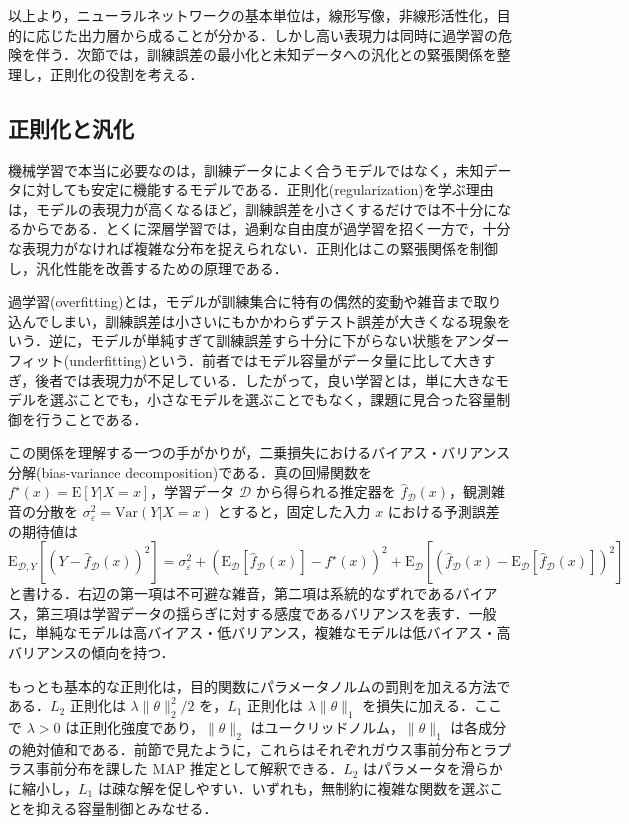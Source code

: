 以上より，ニューラルネットワークの基本単位は，線形写像，非線形活性化，目的に応じた出力層から成ることが分かる．しかし高い表現力は同時に過学習の危険を伴う．次節では，訓練誤差の最小化と未知データへの汎化との緊張関係を整理し，正則化の役割を考える．

\subsection{正則化と汎化}
機械学習で本当に必要なのは，訓練データによく合うモデルではなく，未知データに対しても安定に機能するモデルである．正則化(regularization)を学ぶ理由は，モデルの表現力が高くなるほど，訓練誤差を小さくするだけでは不十分になるからである．とくに深層学習では，過剰な自由度が過学習を招く一方で，十分な表現力がなければ複雑な分布を捉えられない．正則化はこの緊張関係を制御し，汎化性能を改善するための原理である．

過学習(overfitting)とは，モデルが訓練集合に特有の偶然的変動や雑音まで取り込んでしまい，訓練誤差は小さいにもかかわらずテスト誤差が大きくなる現象をいう．逆に，モデルが単純すぎて訓練誤差すら十分に下がらない状態をアンダーフィット(underfitting)という．前者ではモデル容量がデータ量に比して大きすぎ，後者では表現力が不足している．したがって，良い学習とは，単に大きなモデルを選ぶことでも，小さなモデルを選ぶことでもなく，課題に見合った容量制御を行うことである．

この関係を理解する一つの手がかりが，二乗損失におけるバイアス・バリアンス分解(bias-variance decomposition)である．真の回帰関数を $f^\star(x)=\mathrm{E}[Y|X=x]$，学習データ $\mathcal D$ から得られる推定器を $\hat f_{\mathcal D}(x)$，観測雑音の分散を $\sigma_\varepsilon^2=\mathrm{Var}(Y|X=x)$ とすると，固定した入力 $x$ における予測誤差の期待値は
\begin{equation}
\mathrm{E}_{\mathcal D,Y}\left[(Y-\hat f_{\mathcal D}(x))^2\right]
= \sigma_\varepsilon^2
+ \left(\mathrm{E}_{\mathcal D}[\hat f_{\mathcal D}(x)]-f^\star(x)\right)^2
+ \mathrm{E}_{\mathcal D}\left[
\left(
\hat f_{\mathcal D}(x)-\mathrm{E}_{\mathcal D}[\hat f_{\mathcal D}(x)]
\right)^2
\right]
\end{equation}
と書ける．右辺の第一項は不可避な雑音，第二項は系統的なずれであるバイアス，第三項は学習データの揺らぎに対する感度であるバリアンスを表す．一般に，単純なモデルは高バイアス・低バリアンス，複雑なモデルは低バイアス・高バリアンスの傾向を持つ．

もっとも基本的な正則化は，目的関数にパラメータノルムの罰則を加える方法である．$L_2$ 正則化は $\lambda\|\theta\|_2^2/2$ を，$L_1$ 正則化は $\lambda\|\theta\|_1$ を損失に加える．ここで $\lambda>0$ は正則化強度であり，$\|\theta\|_2$ はユークリッドノルム，$\|\theta\|_1$ は各成分の絶対値和である．前節で見たように，これらはそれぞれガウス事前分布とラプラス事前分布を課した MAP 推定として解釈できる．$L_2$ はパラメータを滑らかに縮小し，$L_1$ は疎な解を促しやすい．いずれも，無制約に複雑な関数を選ぶことを抑える容量制御とみなせる．

